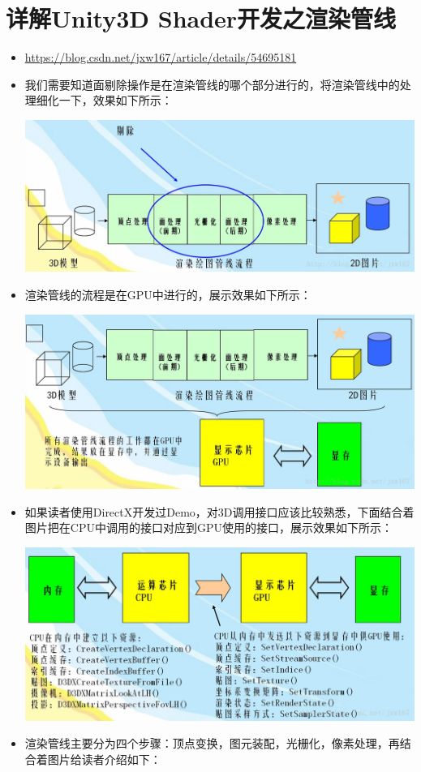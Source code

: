 \documentclass[9pt, b5paper]{article}
\begin{document}
\section{详解Unity3D Shader开发之渲染管线}
\label{sec-4}
\begin{itemize}
\item \url{https://blog.csdn.net/jxw167/article/details/54695181}
\item 我们需要知道面剔除操作是在渲染管线的哪个部分进行的，将渲染管线中的处理细化一下，效果如下所示：

\includegraphics[width=.9\linewidth]{./pic/culling.png}
\item 渲染管线的流程是在GPU中进行的，展示效果如下所示：

\includegraphics[width=.9\linewidth]{./pic/gpuculling.png}
\item 如果读者使用DirectX开发过Demo，对3D调用接口应该比较熟悉，下面结合着图片把在CPU中调用的接口对应到GPU使用的接口，展示效果如下所示：

\includegraphics[width=.9\linewidth]{./pic/cullingfuncs.png}
\item 渲染管线主要分为四个步骤：顶点变换，图元装配，光栅化，像素处理，再结合着图片给读者介绍如下：


\end{itemize}
\end{document}
